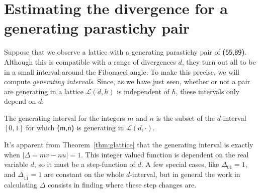 \section{Estimating the divergence for a generating parastichy pair}
Suppose that we observe a lattice with a  generating parastichy pair of $\textsf{(55,89)}$. Although this is  compatible with a range of divergences $d$, they turn out all to be in a small interval around the Fibonacci angle. To make this precise, we will 
compute \emph{generating intervals}. Since, as we have just seen, whether or not a pair are generating in a lattice $  \mathcal{L}(d,h)$ is independent of $h$, these intervals only depend on $d$:
\begin{definition}
	The generating interval for the integers $m$ and $n$ is the subset
	of the $d$-interval $[0,1]$ for which $\textsf{(m,n)}$ is generating in  $\mathcal{L}(d,\cdot)$.
\end{definition}
It's apparent from Theorem~\ref{thm:glattice} that the generating interval is exactly when 
 $|\Delta=mv-nu|=1$. This integer valued function is dependent on the real variable $d$, so it must be a step-function of $d$. A few special cases, like $\Delta_{01}=1$, and $\Delta_{1\hat 1}=1$ are constant on the whole $d$-interval, but in general the work in calculating $\Delta$ consists in finding where these step changes are.%



